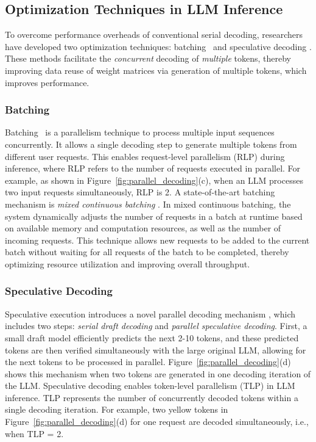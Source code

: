 \subsection{Optimization Techniques in LLM Inference}

To overcome performance overheads of conventional serial decoding, researchers have developed two optimization techniques: batching~\cite{vaswani2017attention, yu2022orca, agrawal2023sarathi, patel2024splitwise} and speculative decoding \cite{leviathan2023fast, chen2023accelerating, spector2023accelerating, zhang2023draft}. These methods facilitate the \emph{concurrent} decoding of \emph{multiple} tokens, thereby improving data reuse of weight matrices via generation of multiple tokens, which improves performance. 



\subsubsection{Batching}
Batching~\cite{vaswani2017attention, yu2022orca, agrawal2023sarathi, patel2024splitwise} is a parallelism technique to process multiple input sequences concurrently. It allows a single decoding step to generate multiple tokens from different user requests.
This enables request-level parallelism (RLP) during inference, where RLP refers to the number of requests executed in parallel. For example, as shown in Figure~\ref{fig:parallel_decoding}(c), when an LLM processes two input requests simultaneously, RLP is 2. A state-of-the-art batching mechanism is \emph{mixed continuous batching} \cite{agrawal2023sarathi, patel2024splitwise}. In mixed continuous batching, the system dynamically adjusts the number of requests in a batch at runtime based on available memory and computation resources, as well as the number of incoming requests. This technique allows new requests to be added to the current batch without waiting for all requests of the batch to be completed, thereby optimizing resource utilization and improving overall throughput.




\subsubsection{Speculative Decoding} Speculative execution introduces a novel parallel decoding mechanism \cite{leviathan2023fast, chen2023accelerating}, which includes two steps: \emph{serial draft decoding} and \emph{parallel speculative decoding}.
First, a small draft model efficiently predicts the next 2-10 tokens, and these predicted tokens are then verified simultaneously with the large original LLM, allowing for the next tokens to be processed in parallel. Figure~\ref{fig:parallel_decoding}(d) shows this mechanism when two tokens are generated in one decoding iteration of the LLM. Speculative decoding enables token-level parallelism (TLP) in LLM inference.
TLP represents the number of concurrently decoded tokens within a single decoding iteration. For example, two yellow tokens in Figure~\ref{fig:parallel_decoding}(d) for one request are decoded simultaneously, i.e., when TLP = 2.